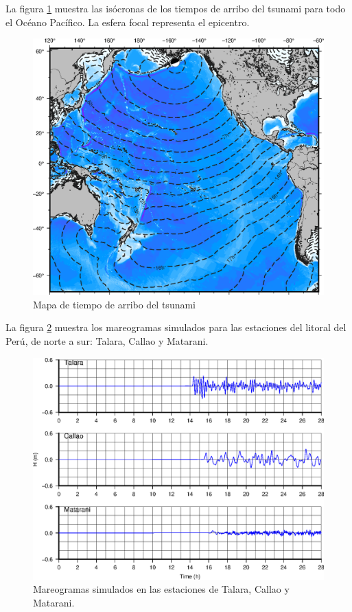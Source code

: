 \documentclass[a4paper,11pt,twocolumn]{article}
\begin{document}
La figura \ref{fig:ttt} muestra las isócronas de los tiempos de arribo del tsunami para todo el Océano Pacífico. La esfera focal representa el epicentro.

\begin{figure}[H]
  \centering
  \includegraphics[width=\linewidth]{ttt.eps}
  \caption{Mapa de tiempo de arribo del tsunami}
  \label{fig:ttt}
\end{figure}

La figura \ref{fig:mareogramas} muestra los mareogramas simulados para las estaciones del litoral del Perú, de norte a sur: Talara, Callao y Matarani.

\begin{figure}[H]
  \centering
  \includegraphics[width=\linewidth]{mareograma.eps}
  \caption{Mareogramas simulados en las estaciones de Talara, Callao y Matarani.}
  \label{fig:mareogramas}
\end{figure}
\end{document}
